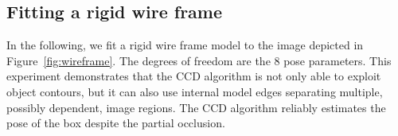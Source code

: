 

\subsection{Fitting a rigid wire frame}
\label{sec:fdo}
In the following, we fit a rigid wire frame model to the image
depicted in Figure~\ref{fig:wireframe}.  The degrees of freedom
are the 8 pose parameters. This experiment demonstrates that the CCD
algorithm is not only able to exploit object contours, but it can also
use internal model edges separating multiple, possibly dependent,
image regions.  The CCD algorithm reliably estimates the pose of the box despite
the partial occlusion.

\begin{figure}[htbp] 
  \begin{minipage}[t]{0.5\linewidth} 
    \centering  
  \end{minipage}%
  \begin{minipage}[t]{0.5\linewidth} 
    \centering 
  \end{minipage} 
  \begin{minipage}[t]{0.5\linewidth} 
    \centering 

\end{minipage}
\end{figure}

